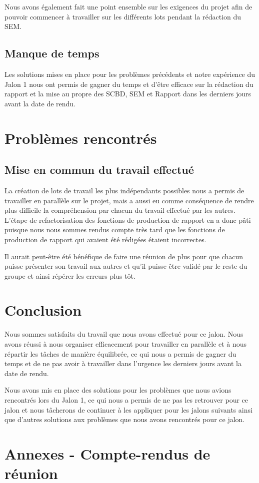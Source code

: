 \documentclass{report}
\begin{document}
Nous avons également fait une point ensemble sur les exigences
du projet afin de pouvoir commencer à travailler sur les différents
lots pendant la rédaction du SEM.

\section{Manque de temps}
Les solutions mises en place pour les problèmes précédents et notre expérience
du Jalon 1 nous
ont permis de gagner du temps et d'être efficace sur
la rédaction du rapport et la mise au propre des SCBD, SEM
et Rapport dans les derniers jours avant la date de rendu.

\chapter{Problèmes rencontrés}
\section{Mise en commun du travail effectué}
La création de lots de travail les plus indépendants possibles
nous a permis de travailler en parallèle sur le projet, mais
a aussi eu comme conséquence de rendre plus difficile la compréhension
par chacun du travail effectué par les autres. L'étape de refactorisation
des fonctions de production de rapport en a donc pâti puisque nous nous
sommes rendus compte très tard que les fonctions de production de rapport
qui avaient été rédigées étaient incorrectes.

Il aurait peut-être été bénéfique de faire une réunion de plus
pour que chacun puisse présenter son travail aux autres et qu'il puisse
être validé par le reste du groupe et ainsi répérer les erreurs plus tôt.

\chapter{Conclusion}
Nous sommes satisfaits du travail que nous avons effectué pour ce jalon.
Nous avons réussi à nous organiser efficacement pour travailler en parallèle
et à nous répartir les tâches de manière équilibrée, ce qui nous a permis
de gagner du temps et de ne pas avoir à travailler dans l'urgence
les derniers jours avant la date de rendu.

Nous avons mis en place des solutions pour les problèmes que nous avions
rencontrés lors du Jalon 1, ce qui nous a permis de ne pas les retrouver
pour ce jalon et nous tâcherons de continuer à les appliquer pour les
jalons suivants ainsi que d'autres solutions aux problèmes que nous
avons rencontrés pour ce jalon.

\chapter*{Annexes - Compte-rendus de réunion}


\end{document}
